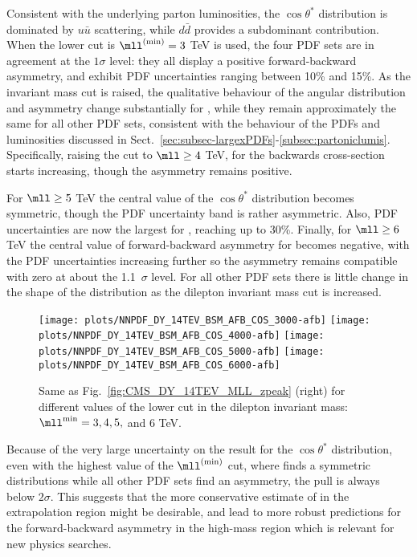  Consistent with the underlying parton luminosities, the $\cos\theta^*$ distribution
 is dominated by $u\bar{u}$ scattering, while  $d\bar{d}$ provides
 a subdominant contribution.
 When the lower cut  is $\mll^{(\rm min)}=3$ TeV is used, the four PDF
 sets are in agreement at the $1\sigma$ level: they all
 display a 
 positive forward-backward asymmetry, and exhibit PDF uncertainties ranging between 10\% and 15\%.
 As the invariant mass cut is raised, the qualitative behaviour of the
 angular distribution and
 asymmetry change substantially for , while they remain
 approximately the same for all other PDF sets, consistent with the
 behaviour of the PDFs and luminosities discussed in
 Sect.~\ref{sec:subsec-largexPDFs}-\ref{subsec:partoniclumis}.
%
 Specifically,
 raising the cut to
 $\mll \ge 4$ TeV, for 
 the backwards cross-section starts increasing, though the asymmetry remains
positive.

For $\mll\ge 5$ TeV the central value of the  $\cos\theta^*$
 distribution  becomes symmetric, though the  PDF uncertainty band is
 rather asymmetric. Also, PDF uncertainties
 are now the largest for , reaching up to 30\%.
 Finally, for $\mll\ge 6$ TeV  the central value of 
 forward-backward asymmetry for  becomes negative, with the
 PDF uncertainties increasing further so the asymmetry remains compatible
 with zero at about the 1.1~$\sigma$ level.
 For all other PDF sets there is little change in the shape of the distribution as the
 dilepton invariant mass cut is increased.

\begin{figure}[t!]
 \centering
 \texttt{[image: plots/NNPDF\_DY\_14TEV\_BSM\_AFB\_COS\_3000-afb]}
 \texttt{[image: plots/NNPDF\_DY\_14TEV\_BSM\_AFB\_COS\_4000-afb]}
 \texttt{[image: plots/NNPDF\_DY\_14TEV\_BSM\_AFB\_COS\_5000-afb]}
 \texttt{[image: plots/NNPDF\_DY\_14TEV\_BSM\_AFB\_COS\_6000-afb]}
 \caption{Same as Fig.~\ref{fig:CMS_DY_14TEV_MLL_zpeak} (right)
   for different values of the  lower cut in the dilepton
   invariant mass: $\mll^{\rm min}=3, 4,5,$ and 6 TeV.
  }    
 \label{fig:CMS_DY_14TEV_MLL_others_asy}
\end{figure}

Because of the very large uncertainty on the  result for the $\cos\theta^*$
distribution, even with
the highest value of the  $\mll^{(\rm  min)}$ cut, where  finds a
symmetric distributions while all other PDF sets find an asymmetry,
the pull is always below $2 \sigma$.
%
This suggests that the more
conservative estimate of   in the extrapolation region might be
desirable, and lead to more robust predictions for the
forward-backward asymmetry in the high-mass region which is relevant
for new physics searches.
